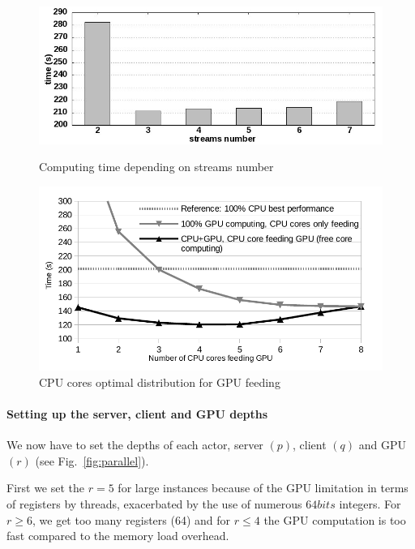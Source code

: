 \begin{figure}[htb]
\begin{minipage}[b]{0.48\linewidth}
\centering
\includegraphics[width=\columnwidth]{figures/langford/streams.jpeg}
\caption{Computing time depending on streams number}
\label{fig:streams}
\end{minipage}
\hfill
\begin{minipage}[b]{0.48\linewidth}
\centering
\includegraphics[width=\columnwidth]{figures/langford/graphe_cores.pdf}
\caption{CPU cores optimal distribution for GPU feeding}\label{cores_rep}
\end{minipage}
\end{figure}

\paragraph{Setting up the server, client and GPU depths}
We now have to set the depths of each actor, server $(p)$, client $(q)$ and GPU $(r)$ (see Fig.~\ref{fig:parallel}).

First we set the $r = 5$ for large instances because of the GPU limitation in terms of registers by threads, exacerbated by the use of numerous $64bits$ integers. For $r \geq 6$, we get too many registers (64) and for $r \leq 4$ the GPU computation is too fast compared to the memory load overhead.

